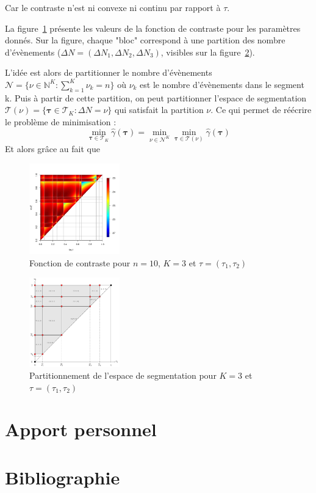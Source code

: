 \documentclass[a4paper,10pt]{article}\usepackage[]{graphicx}\usepackage[]{xcolor}
\newcommand{\segspace}{\mathcal{T}_K}
\newcommand{\N}{\mathbb{N}}
\begin{document}
Car le contraste n'est ni convexe ni continu par rapport à $\tau$.

La figure~\ref{fig:contrast-function} présente les valeurs de la fonction de 
contraste pour les paramètres donnés. Sur la figure, chaque "bloc" correspond à
une partition des nombre d'évènements ($\Delta N = (\Delta N_1, \Delta N_2, 
\Delta N_3)$, visibles sur la figure~\ref{fig:space-partitioning}).

L'idée est alors de partitionner le nombre d'évènements  $\mathcal{N} = 
\bigl\{ \nu \in \N^K : \sum_{k=1}^K \nu_k = n \bigr\}$ où $\nu_k$ est le nombre
d'évènements dans le segment k. Puis à partir de cette partition, on peut 
partitionner l'espace de segmentation $\mathcal{T}(\nu) = 
\bigl\{ \bm \tau \in \segspace : \Delta N = \nu \bigr\}$ qui satisfait la 
partition $\nu$. Ce qui permet de réécrire le problème de minimisation :
$$\min_{\bm{\tau}\in\segspace} \widehat \gamma (\bm{\tau}) = \min_{\nu \in 
\mathcal{N}^K} \min_{\bm{\tau}\in\mathcal{T}(\nu)} \widehat \gamma (\bm{\tau})$$
Et alors grâce au fait que

\begin{figure}
  \centering
  \includegraphics[width=0.35\textwidth]{contrast-function}
  \caption{Fonction de contraste pour $n=10$, $K=3$ et $\tau = (\tau_1,\tau_2)$}
  \label{fig:contrast-function}
\end{figure}

\begin{figure}
  \centering
  \includegraphics[width=0.35\textwidth]{space-partitioning}
  \caption{Partitionnement de l'espace de segmentation pour $K=3$ et $\tau = (\tau_1,\tau_2)$}
  \label{fig:space-partitioning}
\end{figure}

\section{Apport personnel}






\section*{Bibliographie}

\printbibliography
\nocite{*}
\end{document}
